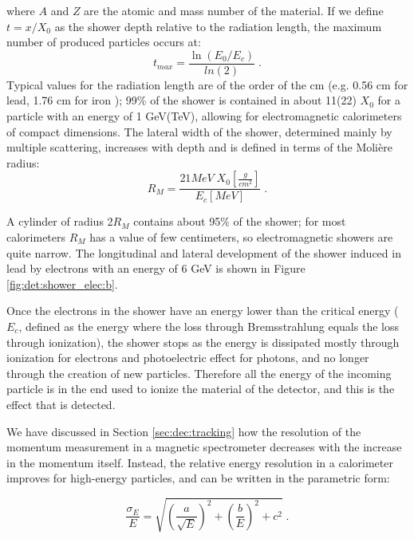 \noindent where $A$ and $Z$ are the atomic and mass number of the material. If we define $t = x/X_0$ as the shower depth relative to the radiation length, the maximum number of produced particles occurs at:
\begin{equation}
t_{max} = \frac{\ln\left(E_0/E_c\right)}{ln\left(2\right)} \;. \nonumber
\end{equation}
Typical values for the radiation length are of the order of the cm (e.g. 0.56 cm for lead, 1.76 cm for iron \cite{Patrignani:2016xqp}); 99\% of the shower is contained in about 11(22) $X_0$ for a particle with an energy of 1 GeV(TeV), 
allowing for electromagnetic calorimeters of compact dimensions. 
The lateral width of the shower, determined mainly by multiple scattering, increases with depth and is defined in terms of the Moli\`ere radius:
\begin{equation}
R_M = \frac{21 MeV \; X_0[\frac{g}{cm^2}]}{E_c [MeV]} \; . \nonumber
\end{equation}

\noindent A cylinder of radius 2$R_M$ contains about 95\% of the shower; for most calorimeters $R_M$ has a value of few centimeters, so electromagnetic showers are quite narrow. The longitudinal and lateral development of the shower induced in lead by electrons with an energy of 6 GeV is shown in Figure \ref{fig:det:shower_elec:b}.

Once the electrons in the shower have an energy lower than the critical energy 
($E_c$, defined as the energy where the loss through Bremsstrahlung equals the loss through ionization), 
the shower stops as the energy is dissipated mostly through ionization for electrons and photoelectric effect for photons, 
and no longer through the creation of new particles. 
Therefore all the energy of the incoming particle is in the end used to ionize the material of the detector, and this is the effect that is detected.


We have discussed in Section \ref{sec:dec:tracking} how the resolution of the momentum measurement in a magnetic spectrometer decreases with the increase in the momentum itself. Instead, the relative energy resolution in a calorimeter improves for high-energy particles, and can be written in the parametric form:

\begin{equation}
\frac{\sigma_E}{E} = \sqrt{\left(\frac{a}{\sqrt{E}} \right)^2 + \left( \frac{b}{E} \right)^2 + c^2 } \; . \nonumber
\end{equation}

